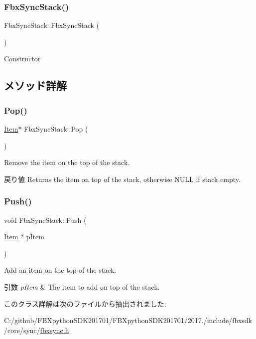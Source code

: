 \subsubsection{\texorpdfstring{Fbx\+Sync\+Stack()}{FbxSyncStack()}}
{\footnotesize\ttfamily Fbx\+Sync\+Stack\+::\+Fbx\+Sync\+Stack (\begin{DoxyParamCaption}{ }\end{DoxyParamCaption})}



Constructor 



\subsection{メソッド詳解}
\mbox{\label{class_fbx_sync_stack_a13b7a3879bf1dab796985893597d443f}} 
\subsubsection{\texorpdfstring{Pop()}{Pop()}}
{\footnotesize\ttfamily \hyperlink{struct_fbx_sync_stack_1_1_item}{Item}$\ast$ Fbx\+Sync\+Stack\+::\+Pop (\begin{DoxyParamCaption}{ }\end{DoxyParamCaption})}

Remove the item on the top of the stack. \begin{DoxyReturn}{戻り値}
Returns the item on top of the stack, otherwise N\+U\+LL if stack empty. 
\end{DoxyReturn}
\mbox{\label{class_fbx_sync_stack_a1412ced243b15737a27bb4a3b30bd40b}} 
\subsubsection{\texorpdfstring{Push()}{Push()}}
{\footnotesize\ttfamily void Fbx\+Sync\+Stack\+::\+Push (\begin{DoxyParamCaption}\item[{\hyperlink{struct_fbx_sync_stack_1_1_item}{Item} $\ast$}]{p\+Item }\end{DoxyParamCaption})}

Add an item on the top of the stack. 
\begin{DoxyParams}{引数}
{\em p\+Item} & The item to add on top of the stack. \\
\hline
\end{DoxyParams}


このクラス詳解は次のファイルから抽出されました\+:\begin{DoxyCompactItemize}
\item 
C\+:/github/\+F\+B\+Xpython\+S\+D\+K201701/\+F\+B\+Xpython\+S\+D\+K201701/2017./include/fbxsdk/core/sync/\hyperlink{fbxsync_8h}{fbxsync.\+h}\end{DoxyCompactItemize}
